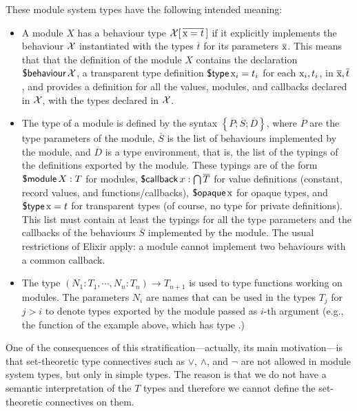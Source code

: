\documentclass[a4paper,10pt]{article}
\begin{document}
  These module system types have the following intended meaning:
  \begin{itemize}
    \item A module $X$ has a behaviour type $\mathcal{X}[\,\overline{\text{\rm x}= t}\,]$ if it explicitly implements the behaviour $\mathcal{X}$ instantiated with the types $\overline{t}$ for its parameters $\overline{\text{\rm x}}$. This means that that the definition of the module $X$ contains the declaration $\operatorname{\textsf{\$behaviour}} \mathcal{X}$, a transparent type definition $\operatorname{\textsf{\$type}} \text{\rm x}_i=t_i$ for each  $\text{\rm x}_i, t_i$, in $\overline{\text{\rm x}}, \overline t$, and provides a definition for all the values, modules, and callbacks declared in $\mathcal{X}$, with the types declared in $\mathcal{X}$. 
    \item The type of a module is defined by the syntax $\left\{\overline{P};\overline{S};\overline{D}\right\}$, where $\overline{P}$ are the type parameters of the module, $\overline{S}$ is the list of behaviours implemented by the module, and $\overline{D}$ is a type environment, that is, the list of the typings of the definitions exported by the module. These typings are of the form $\operatorname{\textsf{\$module}} X : T$ for modules, $\operatorname{\textsf{\$callback}} x : \bigcap \overline{T}$ for value definitions (constant, record values, and functions/callbacks), $\operatorname{\textsf{\$opaque}} \text{\rm x}$ for opaque types, and $\operatorname{\textsf{\$type}} \text{\rm x} = t$ for transparent types (of course, no type for private definitions). This list must contain at least the typings for all the type parameters and the callbacks of the behaviours $\overline{S}$ implemented by the module. The usual restrictions of Elixir apply: a module cannot implement two  behaviours with a common callback. 
    \item The type $(N_1{:} T_1,\cdots, N_n{:}T_n) \to T_{n+1}$ is used to type functions working on modules. The parameters $N_i$ are names that can be used in the types $T_j$ for $j>i$ to denote types exported by the module passed as $i$-th argument (e.g., the  function of the  example above, which has type .)
\end{itemize}

  One of the consequences of this stratification---actually, its main motivation---is that set-theoretic type connectives such as $\vee$, $\wedge$, and $\neg$ are not allowed in module system types, but only in simple types. The reason is that we do not have a semantic interpretation of the $T$ types and therefore we cannot define the set-theoretic connectives on them.
\end{document}
